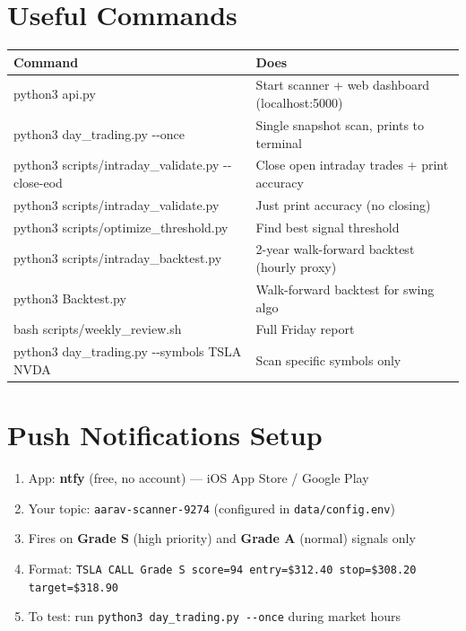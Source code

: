 \documentclass[11pt,a4paper]{article}
\begin{document}
\section{Useful Commands}

\renewcommand{\arraystretch}{1.5}
\begin{tabularx}{\linewidth}{>{\ttfamily\small}p{7.5cm} X}
  \toprule
  \rowcolor{accent}\color{white}\textbf{Command} & \color{white}\textbf{Does} \\
  \midrule
  \rowcolor{lightgray}\small python3 api.py & Start scanner + web dashboard (localhost:5000) \\
  \small python3 day\_trading.py -{}-once & Single snapshot scan, prints to terminal \\
  \rowcolor{lightgray}\small python3 scripts/intraday\_validate.py -{}-close-eod & Close open intraday trades + print accuracy \\
  \small python3 scripts/intraday\_validate.py & Just print accuracy (no closing) \\
  \rowcolor{lightgray}\small python3 scripts/optimize\_threshold.py & Find best signal threshold \\
  \small python3 scripts/intraday\_backtest.py & 2-year walk-forward backtest (hourly proxy) \\
  \rowcolor{lightgray}\small python3 Backtest.py & Walk-forward backtest for swing algo \\
  \small bash scripts/weekly\_review.sh & Full Friday report \\
  \rowcolor{lightgray}\small python3 day\_trading.py -{}-symbols TSLA NVDA & Scan specific symbols only \\
  \bottomrule
\end{tabularx}

\section{Push Notifications Setup}

\begin{enumerate}[leftmargin=1.4em, label=\textbf{\arabic*.}]
  \item App: \textbf{ntfy} (free, no account) --- iOS App Store / Google Play
  \item Your topic: \texttt{aarav-scanner-9274} (configured in \texttt{data/config.env})
  \item Fires on \textbf{Grade S} (high priority) and \textbf{Grade A} (normal) signals only
  \item Format: \texttt{TSLA CALL  Grade S  score=94  entry=\$312.40  stop=\$308.20  target=\$318.90}
  \item To test: run \texttt{python3 day\_trading.py -{}-once} during market hours
\end{enumerate}
\end{document}
